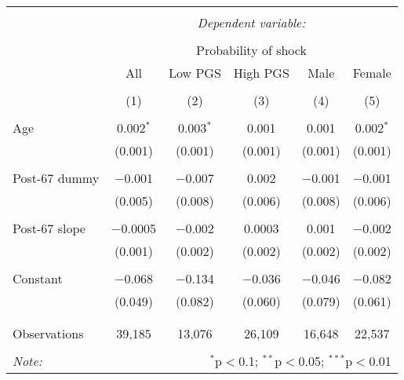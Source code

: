 
\begin{tabular}{@{\extracolsep{5pt}}lccccc} 
\\[-1.8ex]\hline 
\hline \\[-1.8ex] 
 & \multicolumn{5}{c}{\textit{Dependent variable:}} \\ 
\cline{2-6} 
\\[-1.8ex] & \multicolumn{5}{c}{Probability of shock} \\ 
 & All & Low PGS & High PGS & Male & Female \\ 
\\[-1.8ex] & (1) & (2) & (3) & (4) & (5)\\ 
\hline \\[-1.8ex] 
 Age & 0.002$^{*}$ & 0.003$^{*}$ & 0.001 & 0.001 & 0.002$^{*}$ \\ 
  & (0.001) & (0.001) & (0.001) & (0.001) & (0.001) \\ 
  & & & & & \\ 
 Post-67 dummy & $-$0.001 & $-$0.007 & 0.002 & $-$0.001 & $-$0.001 \\ 
  & (0.005) & (0.008) & (0.006) & (0.008) & (0.006) \\ 
  & & & & & \\ 
 Post-67 slope & $-$0.0005 & $-$0.002 & 0.0003 & 0.001 & $-$0.002 \\ 
  & (0.001) & (0.002) & (0.002) & (0.002) & (0.002) \\ 
  & & & & & \\ 
 Constant & $-$0.068 & $-$0.134 & $-$0.036 & $-$0.046 & $-$0.082 \\ 
  & (0.049) & (0.082) & (0.060) & (0.079) & (0.061) \\ 
  & & & & & \\ 
\hline \\[-1.8ex] 
Observations & 39,185 & 13,076 & 26,109 & 16,648 & 22,537 \\ 
\hline 
\hline \\[-1.8ex] 
\textit{Note:}  & \multicolumn{5}{r}{$^{*}$p$<$0.1; $^{**}$p$<$0.05; $^{***}$p$<$0.01} \\ 
\end{tabular} 
